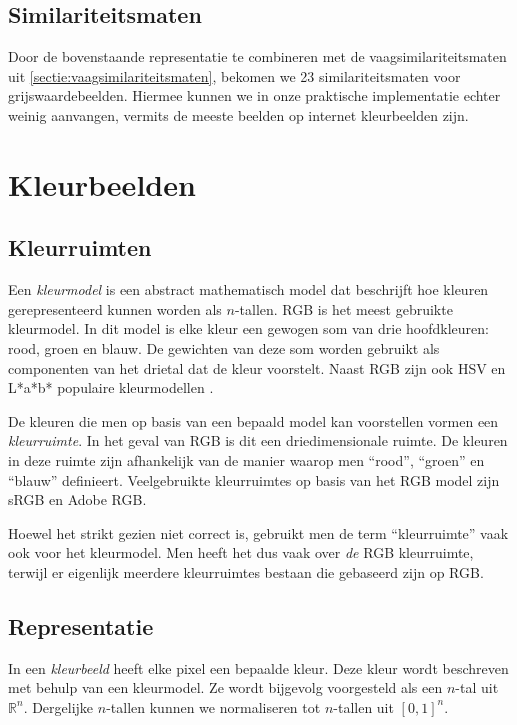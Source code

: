 \subsection{Similariteitsmaten}

Door de bovenstaande representatie te combineren met de vaagsimilariteitsmaten uit 
\ref{sectie:vaagsimilariteitsmaten}, bekomen we 23 similariteitsmaten voor grijswaardebeelden.
Hiermee kunnen we in onze praktische implementatie echter weinig aanvangen, vermits de
meeste beelden op internet kleurbeelden zijn. 


\section{Kleurbeelden}
\label{sectie:pixelgeb_kleurbeelden}

\subsection{Kleurruimten}

Een \emph{kleurmodel} is een abstract mathematisch model dat beschrijft hoe kleuren gerepresenteerd 
kunnen worden als $n$-tallen. RGB is het meest gebruikte kleurmodel. In dit model is elke kleur
een gewogen som van drie hoofdkleuren: rood, groen en blauw. De gewichten van deze som
worden gebruikt als componenten van het drietal dat de kleur voorstelt. Naast RGB zijn ook
HSV en L*a*b* populaire kleurmodellen \cite{phillips:beeldverwerking}.

De kleuren die men op basis van een bepaald model kan voorstellen vormen een \emph{kleurruimte}. 
In het geval van RGB is dit een driedimensionale ruimte. De kleuren in deze ruimte zijn afhankelijk
van de manier waarop men ``rood'', ``groen'' en ``blauw'' definieert. Veelgebruikte kleurruimtes 
op basis van het RGB model zijn sRGB en Adobe RGB.

Hoewel het strikt gezien niet correct is, gebruikt men de term ``kleurruimte'' vaak ook voor het
kleurmodel. Men heeft het dus vaak over \emph{de} RGB kleurruimte, terwijl er eigenlijk meerdere
kleurruimtes bestaan die gebaseerd zijn op RGB. 

\subsection{Representatie}
\label{sectie:kleurbeeld_repr}

In een \emph{kleurbeeld} heeft elke pixel een bepaalde kleur. Deze kleur wordt beschreven met
behulp van een kleurmodel. Ze wordt bijgevolg voorgesteld als een $n$-tal uit
$\mathbb{R}^n$. Dergelijke $n$-tallen kunnen we normaliseren tot $n$-tallen uit $[0,1]^n$. 

